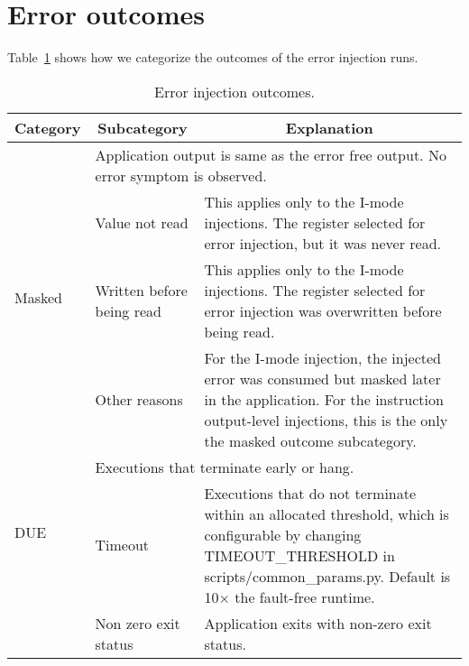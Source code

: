 \section{Error outcomes}

Table~\ref{tab:error-categories} shows how we categorize the outcomes of the error injection runs.

\begin{table}[tbp]
\caption{Error injection outcomes.}
\vspace*{-0.1in}
\label{tab:error-categories}
\centering
\begin{tabular}{|l|p{3cm}|p{10cm}|}
\hline

	\multicolumn{1}{|c|}{Category} & \multicolumn{1}{c|}{Subcategory} & \multicolumn{1}{c|}{Explanation} \\
	\hline 
	\hline

	\multirow{4}{*}{Masked} & \multicolumn{2}{|p{13cm}|}{Application output is same as the error free output. No error symptom is observed.} \\ 
	\cline{2-3}
													& Value not read & This applies only to the I-mode injections. The register selected for error injection, but it was never read. \\
	\cline{2-3}
													& Written before being read & This applies only to the I-mode injections. The register selected for error injection was overwritten before being read. \\ 
	\cline{2-3}
													& Other reasons & For the I-mode injection, the injected error was consumed but masked later in the application. For the instruction output-level injections, this is the only the masked outcome subcategory. \\
	\hline
	\hline

	\multirow{2}{*}{DUE} & \multicolumn{2}{|p{13cm}|}{Executions that terminate early or hang.} \\ 
	\cline{2-3}
											& Timeout & Executions that do not terminate within an allocated threshold, which is configurable by changing TIMEOUT\_THRESHOLD in scripts/common\_params.py. Default is 10$\times$ the fault-free runtime. \\ 
	\cline{2-3}
											& Non zero exit status & Application exits with non-zero exit status. \\ 
	\hline
	\hline



\end{tabular}
\end{table}
